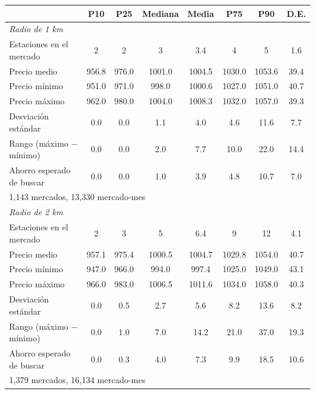 \begin{tabular}{lccccccc}
\toprule
 & P10 & P25 & Mediana & Media & P75 & P90 & D.E. \\
\midrule
\multicolumn{8}{l}{\emph{Radio de 1 km}} \\
Estaciones en el mercado & 2 & 2 & 3 & 3.4 & 4 & 5 & 1.6 \\
Precio medio & 956.8 & 976.0 & 1001.0 & 1004.5 & 1030.0 & 1053.6 & 39.4 \\
Precio mínimo & 951.0 & 971.0 & 998.0 & 1000.6 & 1027.0 & 1051.0 & 40.7 \\
Precio máximo & 962.0 & 980.0 & 1004.0 & 1008.3 & 1032.0 & 1057.0 & 39.3 \\
Desviación estándar & 0.0 & 0.0 & 1.1 & 4.0 & 4.6 & 11.6 & 7.7 \\
Rango (máximo $-$ mínimo) & 0.0 & 0.0 & 2.0 & 7.7 & 10.0 & 22.0 & 14.4 \\
Ahorro esperado de buscar & 0.0 & 0.0 & 1.0 & 3.9 & 4.8 & 10.7 & 7.0 \\
\multicolumn{8}{l}{\footnotesize 1,143 mercados, 13,330 mercado-mes} \\
\midrule
\multicolumn{8}{l}{\emph{Radio de 2 km}} \\
Estaciones en el mercado & 2 & 3 & 5 & 6.4 & 9 & 12 & 4.1 \\
Precio medio & 957.1 & 975.4 & 1000.5 & 1004.7 & 1029.8 & 1054.0 & 40.7 \\
Precio mínimo & 947.0 & 966.0 & 994.0 & 997.4 & 1025.0 & 1049.0 & 43.1 \\
Precio máximo & 966.0 & 983.0 & 1006.5 & 1011.6 & 1034.0 & 1058.0 & 40.3 \\
Desviación estándar & 0.0 & 0.5 & 2.7 & 5.6 & 8.2 & 13.6 & 8.2 \\
Rango (máximo $-$ mínimo) & 0.0 & 1.0 & 7.0 & 14.2 & 21.0 & 37.0 & 19.3 \\
Ahorro esperado de buscar & 0.0 & 0.3 & 4.0 & 7.3 & 9.9 & 18.5 & 10.6 \\
\multicolumn{8}{l}{\footnotesize 1,379 mercados, 16,134 mercado-mes} \\
\bottomrule
\end{tabular}

